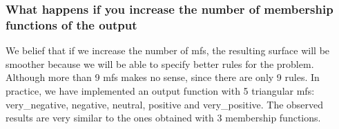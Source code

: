 \documentclass{article}[11pt]
\begin{document}
\subsubsection*{What happens if you increase the number of membership functions of the output}
We belief that if we increase the number of mfs, the resulting surface will be smoother because we will be able to specify better rules for the problem. Although more than 9 mfs makes no sense, since there are only 9 rules. In practice, we have implemented an output function with 5 triangular mfs: very\_negative, negative, neutral, positive and very\_positive. The observed results are very similar to the ones obtained with 3 membership functions. 
\end{document}
